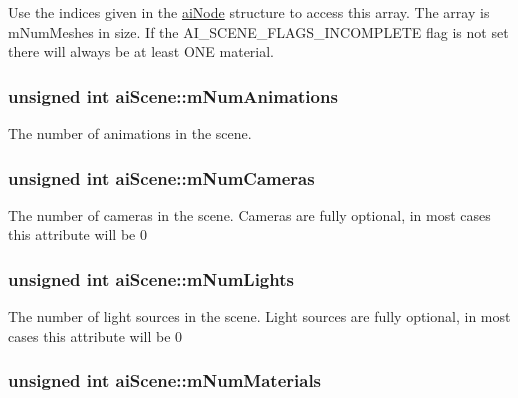 \-Use the indices given in the \hyperlink{structaiNode}{ai\-Node} structure to access this array. \-The array is m\-Num\-Meshes in size. \-If the \-A\-I\-\_\-\-S\-C\-E\-N\-E\-\_\-\-F\-L\-A\-G\-S\-\_\-\-I\-N\-C\-O\-M\-P\-L\-E\-T\-E flag is not set there will always be at least \-O\-N\-E material. \hypertarget{structaiScene_aa2af030ec218ead0dc062b6a96a7471a}{
\subsubsection[{m\-Num\-Animations}]{\setlength{\rightskip}{0pt plus 5cm}unsigned int {\bf ai\-Scene\-::m\-Num\-Animations}}}\label{structaiScene_aa2af030ec218ead0dc062b6a96a7471a}
\-The number of animations in the scene. \hypertarget{structaiScene_a4abc432e1b22a7e01553f33c79c0592f}{
\subsubsection[{m\-Num\-Cameras}]{\setlength{\rightskip}{0pt plus 5cm}unsigned int {\bf ai\-Scene\-::m\-Num\-Cameras}}}\label{structaiScene_a4abc432e1b22a7e01553f33c79c0592f}
\-The number of cameras in the scene. \-Cameras are fully optional, in most cases this attribute will be 0 \hypertarget{structaiScene_a0c90fc5f15b979e0bb0d3e8f1e246307}{
\subsubsection[{m\-Num\-Lights}]{\setlength{\rightskip}{0pt plus 5cm}unsigned int {\bf ai\-Scene\-::m\-Num\-Lights}}}\label{structaiScene_a0c90fc5f15b979e0bb0d3e8f1e246307}
\-The number of light sources in the scene. \-Light sources are fully optional, in most cases this attribute will be 0 \hypertarget{structaiScene_a4277d8bffe8b8f568098af6c31d042b7}{
\subsubsection[{m\-Num\-Materials}]{\setlength{\rightskip}{0pt plus 5cm}unsigned int {\bf ai\-Scene\-::m\-Num\-Materials}}}\label{structaiScene_a4277d8bffe8b8f568098af6c31d042b7}
